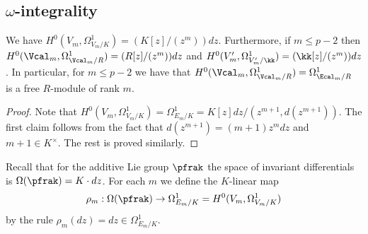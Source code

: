 \subsection{$\omega$-integrality}
\begin{lemma}
\notready\label{LemmaDiffExpl} We have $H^0(V_m, \Omega^1_{V_m/K})=(K[z]/(z^m))dz$. Furthermore, if $m\le p-2$ then $H^0(\Vcal_m,\Omega^1_{\Vcal_m/R}) = (R[z]/(z^m))dz$ and $H^0(V'_m, \Omega^1_{V'_m/\kk})=(\kk[z]/(z^m))dz$. In particular, for $m\le p-2$ we have that $H^0(\Vcal_m,\Omega^1_{\Vcal_m/R})=\Omega^1_{\Ecal_m/R} $ is a free $R$-module of rank $m$.
\end{lemma}
\begin{proof}  Note that $H^0(V_m,\Omega^1_{V_m/K})=\Omega^1_{E_m/K}=K[z]dz/(z^{m+1}, d(z^{m+1}))$. The first claim follows from the fact that $d(z^{m+1})=(m+1)z^mdz$ and $m+1\in K^\times$. The rest is proved similarly.
\end{proof}

Recall that for the additive Lie group $\pfrak$ the space of invariant differentials is $\Omega(\pfrak)=K\cdot dz$. For each $m$ we define the $K$-linear map
$$
\rho_m:\Omega(\pfrak)\to \Omega^1_{E_m/K}=H^0(V_m, \Omega^1_{V_m/K})
$$
by the rule $\rho_m(dz)=dz\in \Omega^1_{E_m/K}$.

